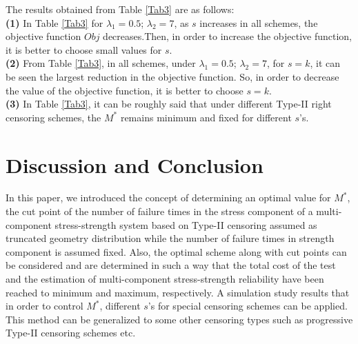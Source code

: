 \documentclass[twoside]{article}
\begin{document}
The results obtained from Table \ref{Tab3} are as follows: \\
 {\bf(1)} In Table \ref{Tab3} for $\lambda_1=0.5$; $\lambda_2=7$, as $s$  increases in all schemes, the objective function
$Obj$ decreases.Then, in order to increase the objective function, it is better to choose small values for  $s$.\\
  {\bf(2)}  From  Table \ref{Tab3}, in  all schemes, under $\lambda_1=0.5$; $\lambda_2=7$,  for  $s=k$,  it can be seen  the largest reduction in the objective function. So, in order to decrease the value of the objective function, it is better to choose $s=k$.\\
 {\bf(3)} In   Table \ref{Tab3}, it can be roughly said that  under different Type-II right censoring schemes, the  $M^*$ remains minimum and fixed for different $s$'s.
\section*{Discussion and Conclusion} 
In this paper, we introduced the concept of determining an optimal value for $M^*$, the cut point of  the number of failure times in the stress component of a  multi-component stress-strength system based on  Type-II censoring  assumed  as truncated geometry  distribution while the number of failure times in strength component is assumed  fixed. Also,  the optimal scheme  along with cut points can be considered and are  determined in such a way that the total cost of the test  and  the  estimation of multi-component stress-strength reliability have been reached to minimum  and maximum, respectively. A simulation study  results that in order to control $M^*$, different $s$'s  for special censoring schemes can be applied. This method can be generalized to some other censoring types such as progressive Type-II censoring schemes etc.
\end{document}
